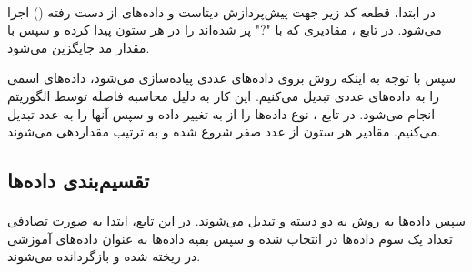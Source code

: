 \documentclass[a4paper,12pt]{article}
\begin{document}
\paragraph{}
در ابتدا، قطعه کد زیر جهت پیش‌پردازش دیتاست و داده‌های از دست رفته
 () اجرا می‌شود.
  در تابع ، مقادیری که با "?" پر شده‌اند را در هر ستون پیدا کرده و سپس با مقدار مد جایگزین می‌شود.

\begin{flushleft}
\end{flushleft}

سپس با توجه به اینکه روش  بروی داده‌های عددی پیاده‌سازی می‌شود، داده‌های اسمی را به داده‌های عددی تبدیل می‌کنیم. این کار به دلیل محاسبه فاصله توسط الگوریتم  انجام می‌شود.
در تابع ، نوع داده‌ها را از  به  تغییر داده و سپس آنها را به عدد تبدیل می‌کنیم. مقادیر هر ستون از عدد صفر شروع شده و به ترتیب مقداردهی می‌شوند.

\begin{flushleft}
\end{flushleft}

\subsection{تقسیم‌بندی داده‌ها}	
\paragraph{}
سپس داده‌ها به روش  به دو دسته  و  تبدیل می‌شوند. در این تابع، ابتدا به صورت تصادفی تعداد یک سوم داده‌ها در  انتخاب شده و سپس بقیه داده‌ها به عنوان داده‌های آموزشی در  ریخته شده و بازگردانده می‌شوند.
\begin{flushleft}
\end{flushleft}
\end{document}
